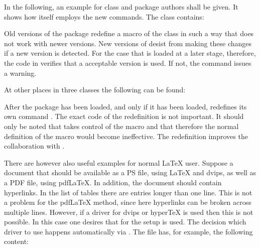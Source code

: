 \begin{Example}
  In the following, an example for class and package authors shall be
  given.  It shows how {\KOMAScript} itself employs the new commands.
  The class  contains:
\begin{lstcode}
\end{lstcode}
  Old versions of the  package redefine a macro of the
   class in such a way that does not work with newer
  {\KOMAScript} versions.  New versions of  desist
  from making these changes if a new {\KOMAScript} version is detected.
  For the case that  is loaded at a later stage,
  therefore, the code in  verifies that a acceptable
   version is used.  If not, the command issues a
  warning.

  At other places in three {\KOMAScript} classes the following can be
  found:
\begin{lstcode}
  \AfterPackage{caption2}{%
    \renewcommand*{\setcapindent}{%
\end{lstcode}
  After the package  has been loaded, and only if it
  has been loaded, {\KOMAScript} redefines its own command
  .  The exact code of the redefinition is not
  important.  It should only be noted that  takes
  control of the  macro and that therefore the normal
  definition of the  macro would become ineffective.
  The redefinition improves the collaboration with .

  There are however also useful examples for normal {\LaTeX} user.  Suppose a
  document that should be available as a PS file, using {\LaTeX} and dvips, as
  well as a PDF file, using pdf{\LaTeX}.  In addition, the document should
  contain hyperlinks.  In the list of tables there are entries longer than one
  line.  This is not a problem for the pdf{\LaTeX} method, since here
  hyperlinks can be broken across multiple lines.  However, if a
   driver for dvips or hyper{\TeX} is used then this is not
  possible.  In this case one desires that for the  setup
   is used. The decision which  driver
  to use happens automatically via . The file has, for
  example, the following content:


\end{Example}
